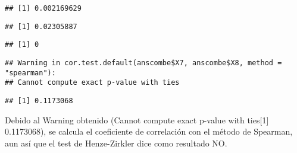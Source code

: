 \documentclass[
]{article}
\newenvironment{Shaded}{\begin{snugshade}}{\end{snugshade}}
\newcommand{\AttributeTok}[1]{\textcolor[rgb]{0.77,0.63,0.00}{#1}}
\newcommand{\FunctionTok}[1]{\textcolor[rgb]{0.00,0.00,0.00}{#1}}
\newcommand{\NormalTok}[1]{#1}
\newcommand{\SpecialCharTok}[1]{\textcolor[rgb]{0.00,0.00,0.00}{#1}}
\newcommand{\StringTok}[1]{\textcolor[rgb]{0.31,0.60,0.02}{#1}}
\begin{document}
\begin{verbatim}
## [1] 0.002169629
\end{verbatim}

\begin{Shaded}
\end{Shaded}

\begin{verbatim}
## [1] 0.02305887
\end{verbatim}

\begin{Shaded}
\end{Shaded}

\begin{verbatim}
## [1] 0
\end{verbatim}

\begin{Shaded}
\end{Shaded}

\begin{verbatim}
## Warning in cor.test.default(anscombe$X7, anscombe$X8, method = "spearman"):
## Cannot compute exact p-value with ties
\end{verbatim}

\begin{verbatim}
## [1] 0.1173068
\end{verbatim}

Debido al Warning obtenido (Cannot compute exact p-value with
ties{[}1{]} 0.1173068), se calcula el coeficiente de correlación con el
método de Spearman, aun así que el test de Henze-Zirkler dice como
resultado NO.
\end{document}

